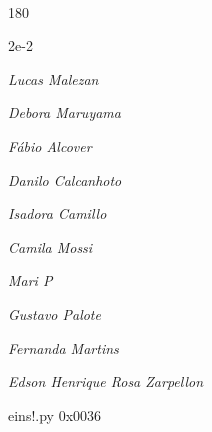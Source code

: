 \documentclass[12pt]{article}
\begin{document}
	\hfill	  	  


\pagebreak			

	\ 
	\vfill
	\begin{turn}{180}	
		\begin{minipage}{\textwidth}
		  	\ttfamily %
			\centering
			{\Huge 2e-2}
		  
			\hfill
		  
			

\textit{\small Lucas Malezan}

\textit{\small Debora Maruyama}

\textit{\small Fábio Alcover}

\textit{\small Danilo Calcanhoto}

\textit{\small Isadora Camillo}

\textit{\small Camila Mossi}

\textit{\small Mari P}

\textit{\small Gustavo Palote}

\textit{\small Fernanda Martins}

\textit{\small Edson Henrique Rosa Zarpellon}

\bigskip

eins!.py
0x0036


		\end{minipage}	
	\end{turn}
	\vfill
	\

\pagebreak
\end{document}
